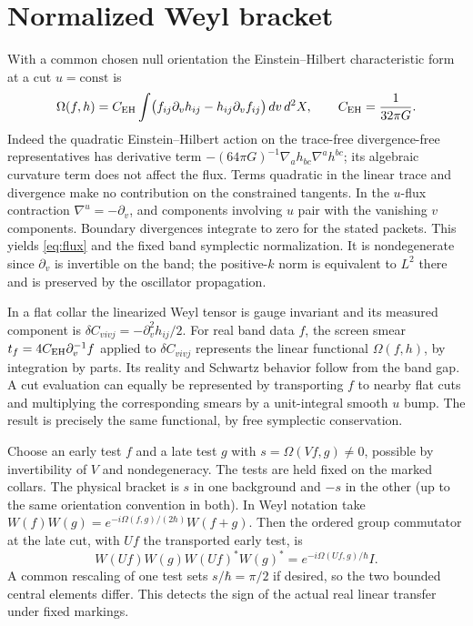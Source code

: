 \documentclass[11pt]{article}
\begin{document}
\section{Normalized Weyl bracket}
With a common chosen null orientation the Einstein--Hilbert characteristic form at a cut $u=\mathrm{const}$ is
\begin{equation}
 \Omega(f,h)=C_{\rm EH}\int
 \bigl(f_{ij}\partial_vh_{ij}-h_{ij}\partial_v f_{ij}\bigr)\,dv\,d^2X,
 \qquad C_{\rm EH}=\frac{1}{32\pi G}.
 \label{eq:flux}
\end{equation}
Indeed the quadratic Einstein--Hilbert action on the trace-free divergence-free representatives has derivative term
$-(64\pi G)^{-1}\nabla_a h_{bc}\nabla^a h^{bc}$; its algebraic curvature term does not affect the flux. Terms quadratic in the linear trace and divergence make no contribution on the constrained tangents. In the $u$-flux contraction $\nabla^u=-\partial_v$, and components involving $u$ pair with the vanishing $v$ components. Boundary divergences integrate to zero for the stated packets. This yields \eqref{eq:flux} and the fixed band symplectic normalization. It is nondegenerate since $\partial_v$ is invertible on the band; the positive-$k$ norm is equivalent to $L^2$ there and is preserved by the oscillator propagation.

In a flat collar the linearized Weyl tensor is gauge invariant and its measured component is $\delta C_{vivj}=-\partial_v^2h_{ij}/2$. For real band data $f$, the screen smear $t_f=4C_{\rm EH}\partial_v^{-1}f$ applied to $\delta C_{vivj}$ represents the linear functional $\Omega(f,h)$, by integration by parts. Its reality and Schwartz behavior follow from the band gap. A cut evaluation can equally be represented by transporting $f$ to nearby flat cuts and multiplying the corresponding smears by a unit-integral smooth $u$ bump. The result is precisely the same functional, by free symplectic conservation.

Choose an early test $f$ and a late test $g$ with $s=\Omega(Vf,g)\ne0$, possible by invertibility of $V$ and nondegeneracy. The tests are held fixed on the marked collars. The physical bracket is $s$ in one background and $-s$ in the other (up to the same orientation convention in both). In Weyl notation take
$W(f)W(g)=e^{-i\Omega(f,g)/(2\hbar)}W(f+g)$. Then the ordered group commutator at the late cut, with $Uf$ the transported early test, is
\[
 W(Uf)W(g)W(Uf)^*W(g)^*=e^{-i\Omega(Uf,g)/\hbar}I .
\]
A common rescaling of one test sets $s/\hbar=\pi/2$ if desired, so the two bounded central elements differ. This detects the sign of the actual real linear transfer under fixed markings.
\end{document}
